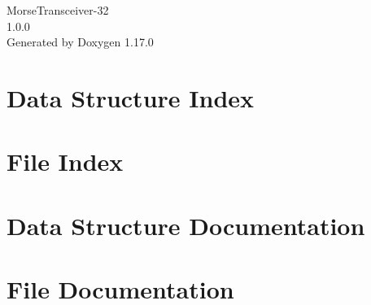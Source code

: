 \documentclass[twoside]{book}
\newcommand{\+}{\discretionary{\mbox{\scriptsize$\hookleftarrow$}}{}{}}
\newcommand{\clearemptydoublepage}{%
    \newpage{\pagestyle{empty}\cleardoublepage}%
  }
\begin{document}
  \raggedbottom
    \hypersetup{pageanchor=false,
                bookmarksnumbered=true,
                pdfencoding=unicode
               }
  \begin{titlepage}
  \vspace*{7cm}
  \begin{center}%
  {\Large Morse\+Transceiver-\/32}\\
  [1ex]\large 1.\+0.\+0 \\
  \vspace*{1cm}
  {\large Generated by Doxygen 1.17.0}\\
  \end{center}
  \end{titlepage}
  \clearemptydoublepage
  \tableofcontents
  \clearemptydoublepage
  \hypersetup{pageanchor=true}
\chapter{Data Structure Index}

\chapter{File Index}

\chapter{Data Structure Documentation}




\chapter{File Documentation}



  \backmatter
  \newpage
  \clearemptydoublepage
  \printindex
\end{document}

